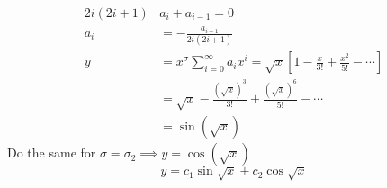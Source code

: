 \documentclass[Maths.tex]{subfiles}
\begin{document}
\begin{example}
\begin{align*}
    2i(2i+1)&a_i + a_{i-1} = 0 \\
    a_i &= -\frac{a_{i-1}}{2i(2i+1)} \\
    y &= x^\sigma \sum_{i=0}^\infty a_ix^i = \sqrt{x}\left[1 - \frac{x}{3!} + \frac{x^2}{5!} - \cdots \right] \\
    &= \sqrt{x} - \frac{(\sqrt{x})^3}{3!} + \frac{(\sqrt{x})^6}{5!} - \cdots \\
    &= \sin(\sqrt{x})
\end{align*}
Do the same for $\sigma = \sigma_2 \implies y = \cos(\sqrt{x})$
\begin{equation*}
    y = c_1\sin\sqrt{x} + c_2\cos\sqrt{x}
\end{equation*}
\end{example}

\chapter{}
\end{document}
